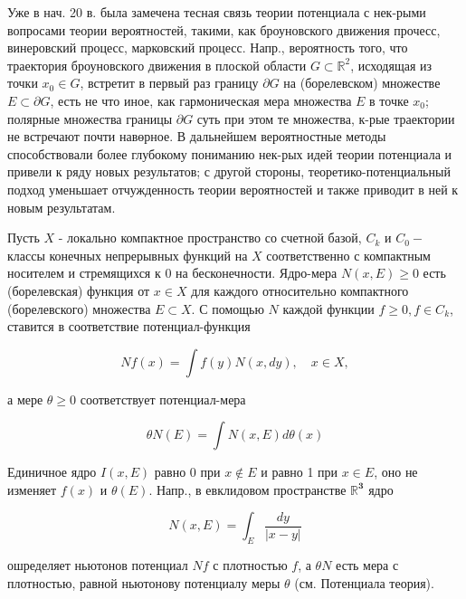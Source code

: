 \documentclass[10pt]{article}
\begin{document}
Уже в нач. 20 в. была замечена тесная связь теории потенциала с нек-рыми вопросами теории вероятностей, такими, как броуновского движения прочесс, винеровский процесс, марковский процесс. Напр., вероятность того, что траектория броуновского движения в плоской области $G \subset \mathbb{R}^{2}$, исходящая из точки $x_{0} \in G$, встретит в первый раз границу $\partial G$ на (борелевском) множестве $E \subset \partial G$, есть не что иное, как гармоническая мера множества $E$ в точке $x_{0}$; полярные множества границы $\partial G$ суть при этом те множества, к-рые траектории не встречают почти навөрное. В дальнейшем вероятностные методы способствовали более глубокому пониманию нек-рых идей теории потенциала и привели к ряду новых результатов; с другой стороны, теоретико-потенциальный подход уменьшает отчужденность теории вероятностей и также приводит в ней к новым результатам.



Пусть $X$ - локально компактное пространство со счетной базой, $C_{k}$ и $C_{0}-$ классы конечных непрерывных функций на $X$ соответственно с компактным носителем и стремящихся к 0 на бесконечности. Ядро-мера $N(x, E) \geqslant 0$ есть (борелевская) функция от $x \in X$ для каждого относительно компактного (борелевского) множества $E \subset X$. С помощью $N$ каждой функции $f \geqslant 0, f \in C_{k}$, ставится в соответствие потенциал-функция



\[

N f(x)=\int f(y) N(x, d y), \quad x \in X,

\]



а мере $\theta \geqslant 0$ соответствует потенциал-мера



\[

\theta N(E)=\int N(x, E) d \theta(x)

\]



Единичное ядро $I(x, E)$ равно 0 при $x \notin E$ и равно 1 при $x \in E$, оно не изменяет $f(x)$ и $\theta(E)$. Напр., в евклидовом пространстве $\mathbb{R}^{\mathbf{3}}$ ядро



\[

N(x, E)=\int_{E} \frac{d y}{|x-y|}

\]



ошределяет ньютонов потенциал $N f$ с плотностью $f$, а $\theta N$ есть мера с плотностью, равной ньютонову потенциалу меры $\theta$ (см. Потенциала теория).
\end{document}
